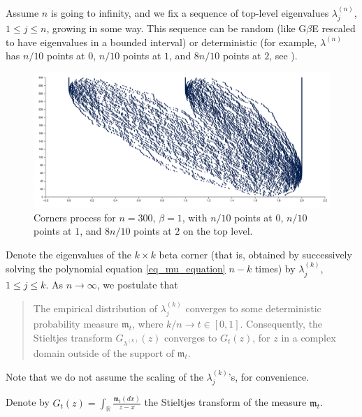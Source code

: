 \documentclass[letterpaper,11pt,oneside,reqno]{article}
\numberwithin{equation}{section}
\theoremstyle{definition}
\begin{document}
Assume $n$ is going to infinity, and we fix a sequence of 
top-level eigenvalues $\lambda^{(n)}_j$, $1\le j \le n$,
growing in some way. This sequence can be random 
(like G$\beta$E rescaled to have eigenvalues in a bounded interval)
or deterministic 
(for example, $\lambda^{(n)}$ has $n/10$ points at $0$,
$n/10$ points at $1$, and $8n/10$ points at $2$, 
see ).
\begin{figure}[htpb]
	\centering
	\includegraphics[width=\textwidth]{./pictures/corners.png}
	\caption{Corners process for $n=300$,
	$\beta=1$, with $n/10$ points at $0$,
	$n/10$ points at $1$, and $8n/10$ points at $2$ on the top level.}
	\label{fig:corners}
\end{figure}

Denote the eigenvalues
of the $k\times k$ beta corner (that is, 
obtained by successively solving the polynomial equation
\eqref{eq_mu_equation} 
$n-k$ times) by $\lambda^{(k)}_j$, $1\le j \le k$.
As $n\to\infty$, we postulate that
\begin{quote}
	The empirical distribution of $\lambda^{(k)}_j$
	converges to some deterministic probability measure
	$\mathfrak{m}_t$, where $k/n\to t\in[0,1]$.
	Consequently, the Stieltjes transform $G_{\lambda^{(k)}}(z)$
	converges to $G_t(z)$, for $z$ in a complex domain
	outside of the support of $\mathfrak{m}_t$.
\end{quote}
Note that we do not assume the scaling of the
$\lambda^{(k)}_j$'s, for convenience.

Denote by $\displaystyle
G_t(z)=\int_{\mathbb{R}}\frac{\mathfrak{m}_t(dx)}{z-x}$
the Stieltjes transform of the measure $\mathfrak{m}_t$.
\end{document}
